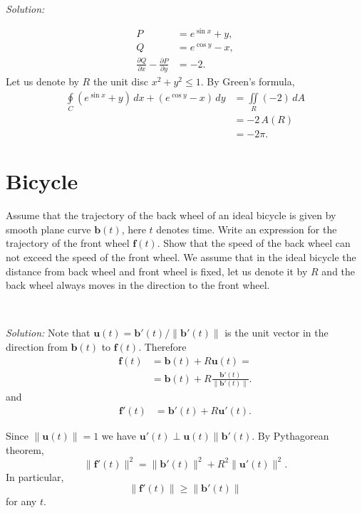 \documentclass{article}
\def\ge{\geqslant}%
\def\le{\leqslant}%
\begin{document}
\ 

\noindent\textit{Solution:}

\begin{align*}
P&= e^{\sin x}+y,
\\
Q&=e^{\cos y}-x,
\\
\frac{\partial Q}{\partial x}-\frac{\partial P}{\partial y}&=-2.
\end{align*}
Let us denote by $R$ the unit disc $x^2+y^2\le 1$.
By Green's formula,
\begin{align*}
\oint\limits_C (e^{\sin x}+y)\,dx+(e^{\cos y}-x)\,dy
&=
\iint\limits_R(-2)\,dA
\\
&=-2\, A(R)
\\
&=-2\pi.
\end{align*}









\section*{
Bicycle
}

Assume that the trajectory of the back wheel of an ideal bicycle is given by smooth plane curve $\mathbf{b}(t)$, here $t$ denotes time. Write an expression for the trajectory of the front wheel $\mathbf{f}(t)$. 
Show that the speed of the back wheel can not exceed the speed of the front wheel.
We assume that in the ideal bicycle the distance from back wheel and front wheel is fixed, let us denote it by $R$ and the back wheel always moves in the direction to the front wheel.

\ 
  

\noindent\textit{Solution:} Note that $\mathbf{u}(t)=\mathbf{b}'(t)/\|\mathbf{b}'(t)\|$ is the unit vector in the direction from $\mathbf{b}(t)$ to $\mathbf{f}(t)$.
Therefore
\begin{align*}
\mathbf{f}(t)&=\mathbf{b}(t)+R\mathbf{u}(t)=
\\
&=\mathbf{b}(t)+R\frac{\mathbf{b}'(t)}{\|\mathbf{b}'(t)\|}.
\end{align*}
and 
\begin{align*}
\mathbf{f}'(t)&=\mathbf{b}'(t)+R\mathbf{u}'(t).
\end{align*}

Since $\|\mathbf{u}(t)\|=1$ we have $\mathbf{u}'(t)\perp\mathbf{u}(t)\parallel \mathbf{b}'(t)$. By Pythagorean theorem,
\[\|\mathbf{f}'(t)\|^2=\|\mathbf{b}'(t)\|^2+R^2\|\mathbf{u}'(t)\|^2.\]
In particular, 
\[\|\mathbf{f}'(t)\|\ge \|\mathbf{b}'(t)\|\]
for any $t$.
\end{document}
